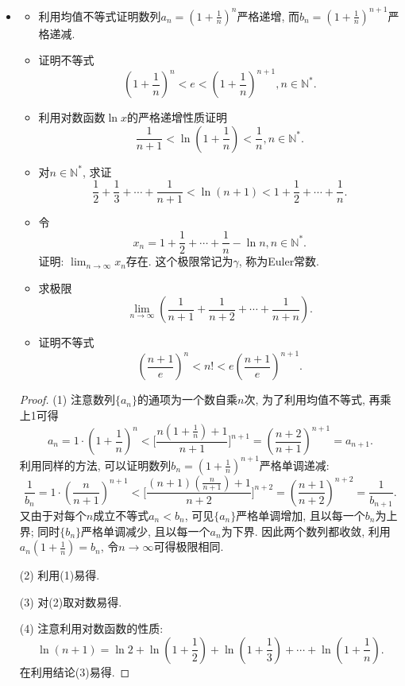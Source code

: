 \documentclass[UTF8,11pt, a4paper, oneside, fontset=none]{ctexbook}
\begin{document}
\begin{itemize}
\item[6.]
\begin{itemize}
\item[(1)] 利用均值不等式证明数列$a_n = \left( 1 + \frac{1}{n}\right)^n$严格递增, 而$b_n = \left( 1 + \frac{1}{n}\right)^{n+1}$严格递减.
\item[(2)] 证明不等式
\[
\left( 1 + \frac{1}{n}\right)^n < e < \left( 1 + \frac{1}{n}\right)^{n+1}, n \in \mathbb N^*.
\]
\item[(3)] 利用对数函数$\ln x$的严格递增性质证明
\[
\frac{1}{n+1} < \ln(1 + \frac{1}{n}) < \frac{1}{n}, n \in \mathbb N^*.
\]
\item[(4)] 对$n \in \mathbb N^*$, 求证
\[
\frac{1}{2} + \frac{1}{3} + \cdots + \frac{1}{n+1} < \ln(n+1) < 1 + \frac{1}{2} + \cdots + \frac{1}{n}.
\]
\item[(5)] 令
\[
x_n = 1 + \frac{1}{2} + \cdots +\frac{1}{n} - \ln n, n \in \mathbb N^*.
\]
证明: $\lim_{n \to \infty} x_n$存在. 这个极限常记为$\gamma$, 称为Euler常数.
\item[(6)] 求极限
\[
\lim_{n \to \infty} \left( \frac{1}{n+1} + \frac{1}{n+2} + \cdots + \frac{1}{n+n}\right).
\]
\item[(7)] 证明不等式
\[
\left( \frac{n+1}{e} \right)^n < n! < e \left( \frac{n+1}{e} \right)^{n+1}.
\]
\end{itemize}


\begin{proof}

(1) 注意数列$\{ a_n \}$的通项为一个数自乘$n$次, 为了利用均值不等式, 再乘上1可得
\[
a_n = 1 \cdot  \left( 1 + \frac{1}{n} \right)^n < \Big[ \frac{n \left( 1 + \frac{1}{n} \right) + 1 }{n+1} \Big]^{n+1} =  \left( \frac{ n+ 2}{n+1} \right)^{n+1} = a_{n+1}.
\]
利用同样的方法, 可以证明数列$b_n =  \left( 1 + \frac{1}{n} \right)^{n+1}$严格单调递减:
\[
\frac{1}{b_n} = 1 \cdot  \left( \frac{n}{n+1} \right)^{n+1} < \Big[ \frac{(n+1)\left( \frac{n}{n+1}\right)+1}{n+2}\Big]^{n+2} =  \left( \frac{n+1}{n+2} \right)^{n+2}  = \frac{1}{b_{n+1}}.
\] 
又由于对每个$n$成立不等式$a_n < b_n$, 可见$\{a_n \}$严格单调增加, 且以每一个$b_n$为上界; 同时$\{b_n \}$严格单调减少, 且以每一个$a_n$为下界. 因此两个数列都收敛, 利用$a_n (1 + \frac{1}{n}) =b_n$, 令$n \to \infty$可得极限相同.

(2) 利用(1)易得.

(3) 对(2)取对数易得.

(4) 注意利用对数函数的性质:
\[
\ln(n+1) = \ln 2 + \ln (1 + \frac{1}{2}) + \ln (1 + \frac{1}{3}) + \cdots + \ln (1 + \frac{1}{n}).
\]
在利用结论(3)易得.


\end{proof}
\end{itemize}
\end{document}
